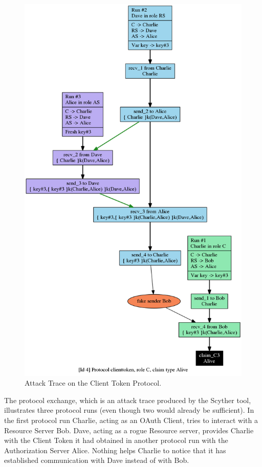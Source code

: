 \documentclass[peerreview, a4paper, 7pt]{IEEEtran}
\begin{document}
\begin{figure}[!htbp]
 \centering
 \includegraphics[scale=0.50]{client-token-attack.png}
 \caption{Attack Trace on the Client Token Protocol.}
 \label{client-token-attack-figure}
\end{figure}

The protocol exchange, which is an attack trace produced by the Scyther tool, illustrates three protocol runs (even though two would already be sufficient). In the first protocol run Charlie, acting as an OAuth Client, tries to interact with a Resource Server Bob.  Dave, acting as a rogue Resource server, provides Charlie with the Client Token it had obtained in another protocol run with the Authorization Server Alice. Nothing helps Charlie to notice that it has established communication with Dave instead of with Bob.  
\end{document}
